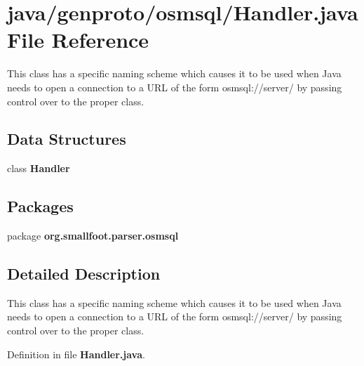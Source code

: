 \section{java/genproto/osmsql/\+Handler.java File Reference}
\label{osmsql_2Handler_8java}


This class has a specific naming scheme which causes it to be used when Java needs to open a connection to a U\+R\+L of the form osmsql\+://server/ by passing control over to the proper class.  


\subsection*{Data Structures}
\begin{DoxyCompactItemize}
\item 
class {\bf Handler}
\end{DoxyCompactItemize}
\subsection*{Packages}
\begin{DoxyCompactItemize}
\item 
package {\bf org.\+smallfoot.\+parser.\+osmsql}
\end{DoxyCompactItemize}


\subsection{Detailed Description}
This class has a specific naming scheme which causes it to be used when Java needs to open a connection to a U\+R\+L of the form osmsql\+://server/ by passing control over to the proper class. 



Definition in file {\bf Handler.\+java}.

